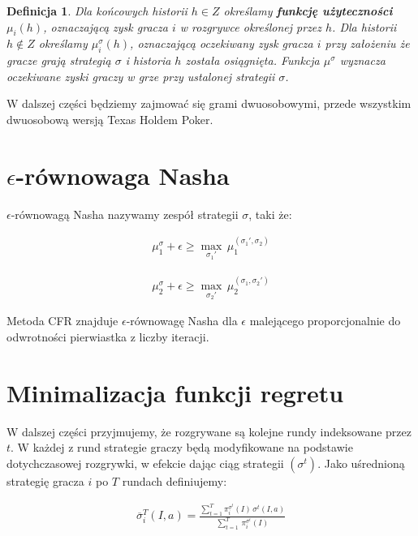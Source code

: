 \documentclass[licencjacka]{pracamgr}
\newtheorem{definition}[theorem]{Definicja}
\begin{document}
\begin{definition}
      Dla końcowych historii $h \in Z$ określamy \textbf{funkcję użyteczności} $\mu_i(h)$, oznaczającą zysk gracza $i$ w rozgrywce
      określonej przez $h$. Dla historii $h \notin Z$ określamy $\mu_i^{\sigma}(h)$, oznaczającą oczekiwany zysk gracza $i$
      przy założeniu że gracze grają strategią $\sigma$ i historia $h$ została osiągnięta. Funkcja $\mu^{\sigma}$ wyznacza
      oczekiwane zyski graczy w grze przy ustalonej strategii $\sigma$.
\end{definition}

\noindent
W dalszej części będziemy zajmować się grami dwuosobowymi, przede wszystkim dwuosobową wersją Texas Holdem Poker.

\section{$\epsilon$-równowaga Nasha}

$\epsilon$-równowagą Nasha nazywamy zespół strategii $\sigma$, taki że:

\begin{align*}
\mu_1^{\sigma} + \epsilon \geq  \max_{\sigma_1'} \, \mu_1^{(\sigma_1', \sigma_2)} 
\end{align*}

\begin{align*}
\mu_2^{\sigma} + \epsilon \geq  \max_{\sigma_2'} \, \mu_2^{(\sigma_1, \sigma_2')} 
\end{align*}

\noindent
Metoda CFR znajduje $\epsilon$-równowagę Nasha dla $\epsilon$ malejącego proporcjonalnie do odwrotności pierwiastka z liczby iteracji.

\section{Minimalizacja funkcji regretu}

W dalszej części przyjmujemy, że rozgrywane są kolejne rundy indeksowane przez $t$. W każdej z rund
strategie graczy będą modyfikowane na podstawie dotychczasowej rozgrywki, w efekcie dając ciąg strategii
$(\sigma^t)$. Jako uśrednioną strategię gracza $i$ po $T$ rundach definiujemy:

\begin{align*}
\overline{\sigma}_i^T(I, a) = \frac{\sum\limits_{t=1}^T \pi_i^{\sigma^t}(I) \, \sigma^t(I, a)}{\sum\limits_{t=1}^T \, \pi_i^{\sigma^t}(I)}
\end{align*}
\end{document}
